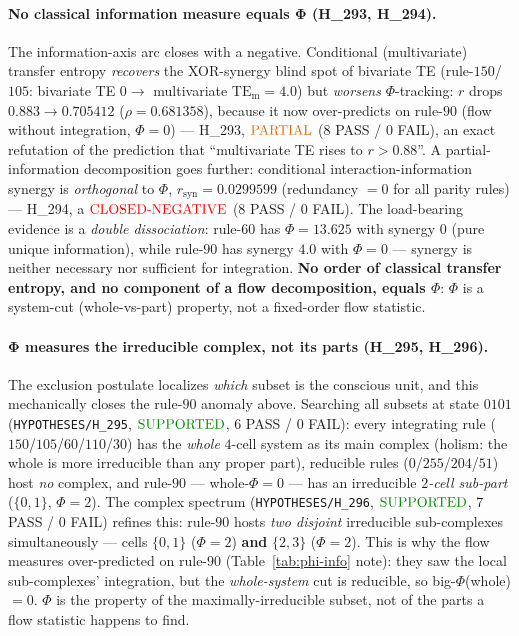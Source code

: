 \documentclass[11pt]{article}
\begin{document}
\paragraph{No classical information measure equals Φ (H\_293, H\_294).} The
information-axis arc closes with a negative. Conditional (multivariate) transfer
entropy \emph{recovers} the XOR-synergy blind spot of bivariate TE (rule-$150$/$105$:
bivariate TE $0\rightarrow$ multivariate $\mathrm{TE_m}=4.0$) but \emph{worsens}
$\Phi$-tracking: $r$ drops $0.883\rightarrow\mathbf{0.705412}$ ($\rho{=}0.681358$),
because it now over-predicts on rule-$90$ (flow without integration, $\Phi{=}0$) ---
H\_293, $\mathbf{\textcolor{orange!85!black}{\text{PARTIAL}}}$ ($8$ PASS / $0$ FAIL), an
exact refutation of the prediction that ``multivariate TE rises to $r{>}0.88$''. A
partial-information decomposition goes further: conditional interaction-information
synergy is \emph{orthogonal} to $\Phi$, $r_\text{syn}=\mathbf{0.0299599}$ (redundancy
$=0$ for all parity rules) --- H\_294, a $\mathbf{\textcolor{red}{\text{CLOSED-NEGATIVE}}}$
($8$ PASS / $0$ FAIL). The load-bearing evidence is a \emph{double dissociation}:
rule-$60$ has $\Phi{=}13.625$ with synergy $0$ (pure unique information), while rule-$90$
has synergy $4.0$ with $\Phi{=}0$ --- synergy is neither necessary nor sufficient for
integration. \textbf{No order of classical transfer entropy, and no component of a
flow decomposition, equals $\Phi$}: $\Phi$ is a system-cut (whole-vs-part) property,
not a fixed-order flow statistic.

\paragraph{Φ measures the irreducible complex, not its parts (H\_295, H\_296).} The
exclusion postulate localizes \emph{which} subset is the conscious unit, and this
mechanically closes the rule-$90$ anomaly above. Searching all subsets at state $0101$
(\texttt{HYPOTHESES/H\_295}, $\mathbf{\textcolor{green!55!black}{\text{SUPPORTED}}}$, $6$
PASS / $0$ FAIL): every integrating rule ($150$/$105$/$60$/$110$/$30$) has the
\emph{whole} $4$-cell system as its main complex (holism: the whole is more irreducible
than any proper part), reducible rules ($0$/$255$/$204$/$51$) host \emph{no} complex,
and rule-$90$ --- whole-$\Phi{=}0$ --- has an irreducible \emph{$2$-cell sub-part}
($\{0,1\}$, $\Phi{=}2$). The complex spectrum (\texttt{HYPOTHESES/H\_296},
$\mathbf{\textcolor{green!55!black}{\text{SUPPORTED}}}$, $7$ PASS / $0$ FAIL) refines
this: rule-$90$ hosts \emph{two disjoint} irreducible sub-complexes simultaneously ---
cells $\{0,1\}$ ($\Phi{=}2$) \textbf{and} $\{2,3\}$ ($\Phi{=}2$). This is why the flow
measures over-predicted on rule-$90$ (Table~\ref{tab:phi-info} note): they saw the
local sub-complexes' integration, but the \emph{whole-system} cut is reducible, so
big-$\Phi$(whole) $=0$. $\Phi$ is the property of the maximally-irreducible subset, not
of the parts a flow statistic happens to find.
\end{document}
